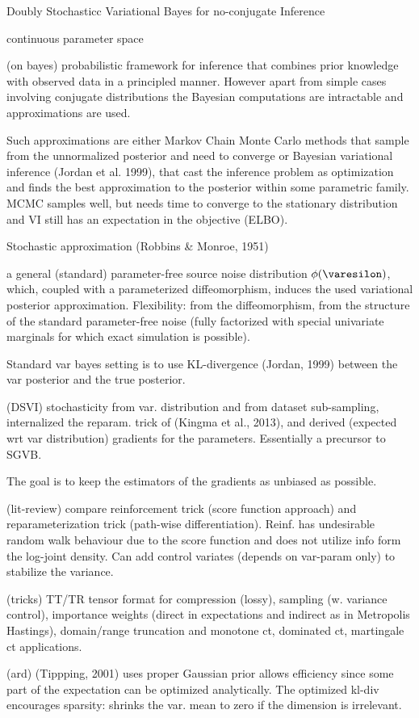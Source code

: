 Doubly Stochasticc Variational Bayes for no-conjugate Inference

continuous parameter space

(on bayes) probabilistic framework for inference that combines prior knowledge with observed
data in a principled manner. However apart from simple cases involving conjugate distributions
the Bayesian computations are intractable and approximations are used.

Such approximations are either Markov Chain Monte Carlo methods that sample from the unnormalized
posterior and need to converge or Bayesian variational inference (Jordan et al. 1999), that
cast the inference problem as optimization and finds the best approximation to the posterior
within some parametric family. MCMC samples well, but needs time to converge to the stationary
distribution and VI still has an expectation in the objective (ELBO).

Stochastic approximation (Robbins & Monroe, 1951)

a general (standard) parameter-free source noise distribution $\phi(\varesilon)$, which, coupled
with a parameterized diffeomorphism, induces the used variational posterior approximation.
Flexibility: from the diffeomorphism, from the structure of the standard parameter-free noise
(fully factorized with special univariate marginals for which exact simulation is possible).

Standard var bayes setting is to use KL-divergence (Jordan, 1999) between the var posterior
and the true posterior.

(DSVI) stochasticity from var. distribution and from dataset sub-sampling, internalized the
reparam. trick of (Kingma et al., 2013), and derived (expected wrt var distribution) gradients
for the parameters. Essentially a precursor to SGVB.

The goal is to keep the estimators of the gradients as unbiased as possible.

(lit-review) compare reinforcement trick (score function approach) and reparameterization trick
(path-wise differentiation). Reinf. has undesirable random walk behaviour due to the score
function and does not utilize info form the log-joint density. Can add control variates (depends
on var-param only) to stabilize the variance.

(tricks) TT/TR tensor format for compression (lossy), sampling (w. variance control), importance
weights (direct in expectations and indirect as in Metropolis Hastings), domain/range truncation
and monotone ct, dominated ct, martingale ct applications.

(ard) (Tippping, 2001) uses proper Gaussian prior allows efficiency since some part of the
expectation can be optimized analytically. The optimized kl-div encourages sparsity: shrinks
the var. mean to zero if the dimension is irrelevant.
